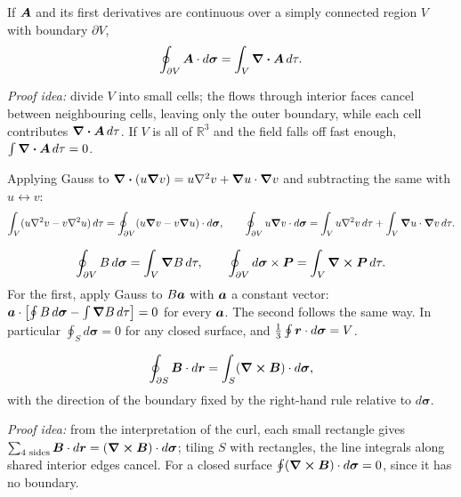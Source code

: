 \begin{theorem}
If $\vect{A}$ and its first derivatives are continuous over a simply connected region $V$ with boundary $\partial V$,
\[
    \oint_{\partial V}\vect{A}\cdot d\boldsymbol{\sigma} = \int_V\div\vect{A}\,d\tau .
\]
\end{theorem}
\textit{Proof idea:} divide $V$ into small cells; the flows through interior faces cancel between neighbouring cells, leaving only the outer boundary, while each cell contributes $\div\vect{A}\,d\tau$. If $V$ is all of $\mathbb{R}^3$ and the field falls off fast enough, $\int\div\vect{A}\,d\tau = 0$.

\begin{theorem}
Applying Gauss to $\div(u\grad v) = u\laplacian v + \grad u\cdot\grad v$ and subtracting the same with $u\leftrightarrow v$:
\[
    \int_V(u\laplacian v - v\laplacian u)\,d\tau = \oint_{\partial V}(u\grad v - v\grad u)\cdot d\boldsymbol{\sigma},
    \qquad
    \oint_{\partial V}u\grad v\cdot d\boldsymbol{\sigma} = \int_Vu\laplacian v\,d\tau + \int_V\grad u\cdot\grad v\,d\tau .
\]
\end{theorem}

\begin{fact}
\[
    \oint_{\partial V}B\,d\boldsymbol{\sigma} = \int_V\grad B\,d\tau,
    \qquad
    \oint_{\partial V}d\boldsymbol{\sigma}\times\vect{P} = \int_V\curl\vect{P}\,d\tau .
\]
For the first, apply Gauss to $B\bm{a}$ with $\bm{a}$ a constant vector: $\bm{a}\cdot\bigl[\oint B\,d\boldsymbol{\sigma} - \int\grad B\,d\tau\bigr] = 0$ for every $\bm{a}$. The second follows the same way. In particular $\oint_S d\boldsymbol{\sigma} = 0$ for any closed surface, and $\tfrac13\oint\bm{r}\cdot d\boldsymbol{\sigma} = V$.
\end{fact}

\begin{theorem}
\[
    \oint_{\partial S}\vect{B}\cdot d\lvect{r} = \int_S(\curl\vect{B})\cdot d\boldsymbol{\sigma},
\]
with the direction of the boundary fixed by the right-hand rule relative to $d\boldsymbol{\sigma}$.
\end{theorem}
\textit{Proof idea:} from the interpretation of the curl, each small rectangle gives $\sum_{4\text{ sides}}\vect{B}\cdot d\lvect{r} = (\curl\vect{B})\cdot d\boldsymbol{\sigma}$; tiling $S$ with rectangles, the line integrals along shared interior edges cancel. For a closed surface $\oint(\curl\vect{B})\cdot d\boldsymbol{\sigma} = 0$, since it has no boundary.

